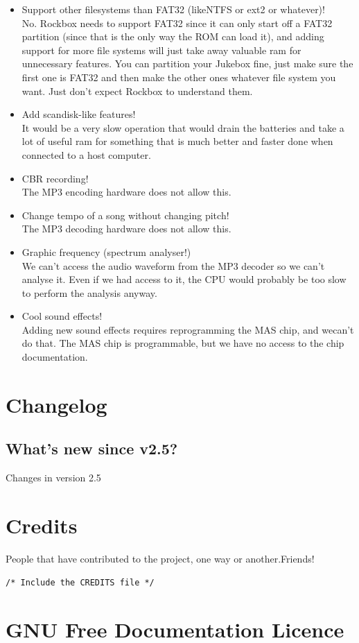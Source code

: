{\begin{itemize}
We cannot access information for that kind of visualisation from the MP3 decoding hardware.
\item Support other filesystems than FAT32 (likeNTFS or ext2 or whatever)!\\
No. Rockbox needs to support FAT32 since it can only start off a FAT32 partition (since that is the only way the ROM can load it), and adding support for more file systems will just take away valuable ram for unnecessary features. You can partition your Jukebox fine, just make sure the first one is FAT32 and then make the other ones whatever file system you want. Just don't expect Rockbox to understand them.
\item Add scandisk{}-like features!\\
It would be a very slow operation that would drain the batteries and take a lot of useful ram for something that is much better and faster done when connected to a host computer.
\item CBR recording!\\
The MP3 encoding hardware does not allow this.
\item Change tempo of a song without changing pitch!\\
 The MP3 decoding hardware does not allow this.
\item Graphic frequency (spectrum analyser!)\\
We can't access the audio waveform from the MP3 decoder so we can't analyse it. Even if we had access to it, the CPU would probably be too slow to perform the analysis anyway.
\item Cool sound effects!\\
 Adding new sound effects requires reprogramming the MAS chip, and wecan't do that. The MAS chip is programmable, but we have no access to the chip documentation.
\end{itemize}
}


\chapter{Changelog}
\section{What's new since v2.5?}
Changes in version 2.5

\chapter{Credits}
People that have contributed to the project, one way or another.Friends!
\begin{verbatim}
/* Include the CREDITS file */
\end{verbatim}

\chapter{GNU Free Documentation Licence}

